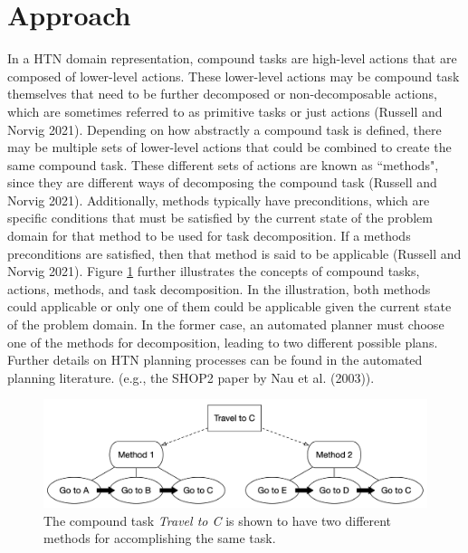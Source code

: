 \section{Approach}
In a HTN domain representation, compound tasks are high-level actions that are composed of lower-level actions. These lower-level actions may be compound task themselves that need to be further decomposed or non-decomposable actions, which are sometimes referred to as primitive tasks or just actions (Russell and Norvig 2021). Depending on how abstractly a compound task is defined, there may be multiple sets of lower-level actions that could be combined to create the same compound task. These different sets of actions are known as ``methods", since they are different ways of decomposing the compound task (Russell and Norvig 2021). Additionally, methods typically have preconditions, which are specific conditions that must be satisfied by the current state of the problem domain for that method to be used for task decomposition. If a methods preconditions are satisfied, then that method is said to be applicable (Russell and Norvig 2021). Figure \ref{fig:1} further illustrates the concepts of compound tasks, actions, methods, and task decomposition. In the illustration, both methods could applicable or only one of them could be applicable given the current state of the problem domain. In the former case, an automated planner must choose one of the methods for decomposition, leading to two different possible plans. Further details on HTN planning processes can be found in the automated planning literature. (e.g., the SHOP2 paper by Nau et al. (2003)). 

\begin{figure}[h]
    \centering
    \includegraphics[width=1\textwidth]{images/htn_concepts}
    \caption{The compound task \textit{Travel to C} is shown to have two different methods for accomplishing the same task.} 
    \label{fig:1}
\end{figure}

